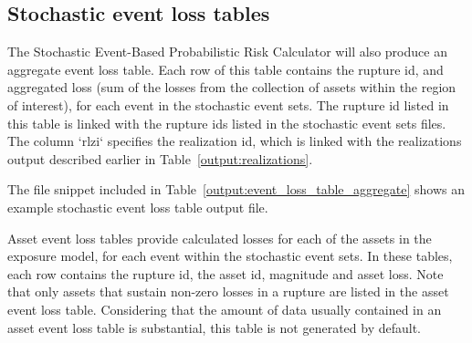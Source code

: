 \subsection{Stochastic event loss tables}

The Stochastic Event-Based Probabilistic Risk Calculator will also produce an
aggregate event loss table. Each row of this table contains the rupture id,
and aggregated loss (sum of the losses from the collection of assets within
the region of interest), for each event in the stochastic event sets. The
rupture id listed in this table is linked with the rupture ids listed in the
stochastic event sets files. The column `rlzi` specifies the realization id,
which is linked with the realizations output described earlier in
Table~\ref{output:realizations}.


The file snippet included in Table~\ref{output:event_loss_table_aggregate}
shows an example stochastic event loss table output file.




Asset event loss tables provide calculated losses for each of the assets in
the exposure model, for each event within the stochastic event sets. In these
tables, each row contains the rupture id, the asset id, magnitude and asset
loss. Note that only assets that sustain non-zero losses in a rupture are
listed in the asset event loss table. Considering that the amount of data
usually contained in an asset event loss table is substantial, this table is
not generated by default. 
